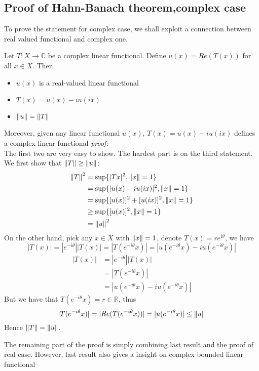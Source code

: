 \subsection{Proof of Hahn-Banach theorem,complex case}
To prove the statement for complex case, we shall exploit a connection between real valued functional and complex one.\\
\begin{proposition}\rm\nextline
	Let $T:X\xrightarrow{}\mathbb{C}$ be a complex linear functional. Define $u(x)=Re(T(x))$ for all $x\in X$. Then
	\begin{itemize}
		\item $u(x)$ is a real-valued linear functional
		\item $T(x)=u(x)-iu(ix)$
		\item $\left\|{u}\right\|=\left\|{T}\right\|$
	\end{itemize}
	Moreover, given any linear functional $u(x)$, $T(x)=u(x)-iu(ix)$ defines a complex linear functional
	\textit{proof:}\\
	The first two are very easy to show. The hardest part is on the third statement. We first show that $\left\|{T}\right\|\geq\left\|{u}\right\|$:
	\begin{equation}
		\begin{split}
			\left\|{T}\right\|^2&=\sup\{|T x|^2,\left\|{x}\right\|=1\}\\
			&=\sup\{|u(x)-iu(ix)|^2,\left\|{x}\right\|=1\}\\
			&=\sup \{[u(x)]^2+[u(ix)]^2,\left\|{x}\right\|=1\}\\
			&\geq \sup \{[u(x)]^2,\left\|{x}\right\|=1\}\\
			&=\left\|{u}\right\|^2
		\end{split}
	\end{equation}
	On the other hand, pick any $x\in X$ with $\left\|{x}\right\|=1$, denote $T(x)=re^{i\theta}$, we have
	$$|T(x)|=|e^{-i\theta}||T(x)|=|T(e^{-i\theta}x)|=|u(e^{-i\theta}x)-iu(e^{-i\theta}x)|$$
	\begin{equation}
		\begin{split}
			|T(x)|&=|e^{-i\theta}||T(x)|\\
			&=|T(e^{-i\theta}x)|\\
			&=|u(e^{-i\theta}x)-iu(e^{-i\theta}x)|
		\end{split}
	\end{equation}
	But we have that $T(e^{-i\theta}x)=r\in\mathbb{R}$, thus
	$$
		|T(e^{-i\theta}x)|=|Re(T(e^{-i\theta}x))|=|u(e^{-i\theta}x)|\leq\left\|{u}\right\|
	$$
	Hence $\left\|{T}\right\|=\left\|{u}\right\|$.
\end{proposition}
The remaining part of the proof is simply combining last result and the proof of real case. However, last result also gives a insight on complex bounded linear functional